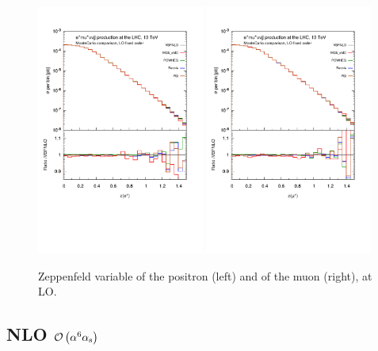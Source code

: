 \documentclass[a4paper,10pt]{report}
\begin{document}
\begin{figure}[h!]
   \centering
   \includegraphics[width=0.49\textwidth,angle=0,clip=true,trim={0.4cm 4.cm 0.6cm 1.5cm}]{figures/ze_LO.pdf}
   \includegraphics[width=0.49\textwidth,angle=0,clip=true,trim={0.4cm 4.cm 0.6cm 1.5cm}]{figures/zmu_LO.pdf}
\caption{\label{fig:zel-muLO}Zeppenfeld variable of the positron (left) and of the muon (right), at LO.
}
\end{figure}



\subsection{NLO $\mathcal{O}\left(\alpha^6\alpha_{\rm s}\right)$}
\end{document}
